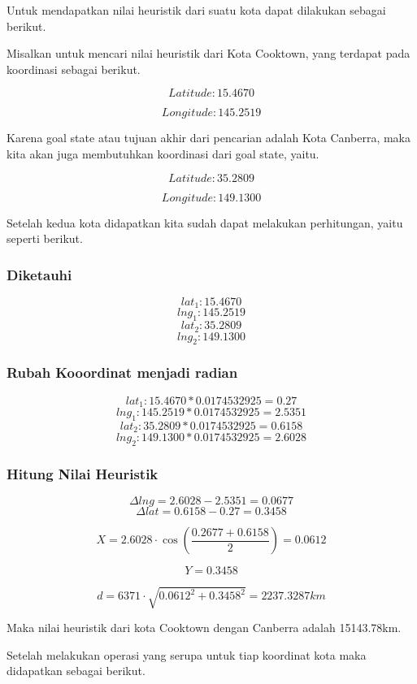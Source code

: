 \documentclass[12pt,a4paper]{article}
\begin{document}
Untuk mendapatkan nilai heuristik dari suatu kota dapat 
dilakukan sebagai berikut.

Misalkan untuk mencari nilai heuristik dari Kota Cooktown,
yang terdapat pada koordinasi sebagai berikut.

\[Latitude: 15.4670 \]

\[Longitude: 145.2519\]

Karena goal state atau tujuan akhir dari pencarian adalah Kota Canberra, maka
kita akan juga membutuhkan koordinasi dari goal state, yaitu.

\[ Latitude: 35.2809  \]

\[ Longitude:149.1300 \]

Setelah kedua kota didapatkan kita sudah dapat melakukan perhitungan, yaitu
seperti berikut.

\subsubsection*{Diketauhi}

\[lat_1: 15.4670\]
\[lng_1: 145.2519\]
\[lat_2: 35.2809\]
\[lng_2: 149.1300\]


\subsubsection*{Rubah Kooordinat menjadi radian}

\[lat_1: 15.4670 * 0.0174532925 = 0.27\]
\[lng_1: 145.2519 * 0.0174532925 = 2.5351\]
\[lat_2: 35.2809 * 0.0174532925 = 0.6158\]
\[lng_2: 149.1300 * 0.0174532925 = 2.6028\]

\subsubsection*{Hitung Nilai Heuristik}

\[\Delta lng = 2.6028 - 2.5351 = 0.0677\]
\[\Delta lat = 0.6158 - 0.27 = 0.3458\]

\[X = 2.6028 \cdot \cos \left( \frac{0.2677 + 0.6158}{2} \right) = 0.0612\]

\[Y = 0.3458\]

\[d = 6371 \cdot \sqrt{0.0612^2 + 0.3458^2} = 2237.3287 km\]

Maka nilai heuristik dari kota Cooktown dengan Canberra adalah 15143.78km.

Setelah melakukan operasi yang serupa untuk tiap koordinat kota maka didapatkan sebagai berikut.
\end{document}
